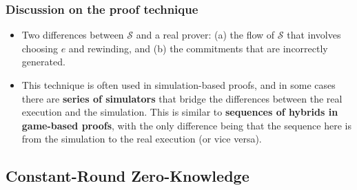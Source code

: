 \documentclass{beamer}
\begin{document}
    \begin{frame}
        \frametitle{Discussion on the proof technique}
        \begin{itemize}
            \item Two differences between $\mathcal{S}$ and a real prover: (a) the flow of $\mathcal{S}$ that involves choosing $e$ and rewinding, and (b) the commitments that are incorrectly generated. 
            \item This technique is often used in simulation-based proofs, and in some cases there are \textbf{series of simulators} that bridge the differences between the real execution and the simulation. This is similar to \textbf{sequences of hybrids in game-based proofs}, with the only difference being that the sequence here is from the simulation to the real execution (or vice versa). 
        \end{itemize}
    
        
    
    \end{frame}
    \subsection{Constant-Round Zero-Knowledge}
    \subsectionpage
\end{document}
